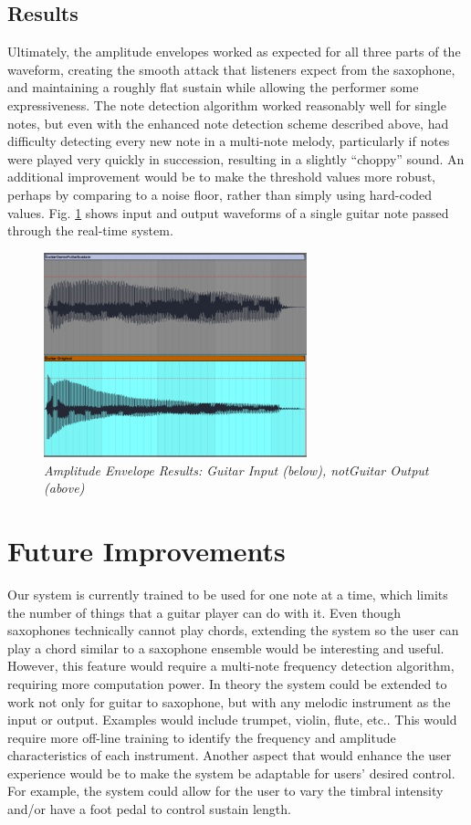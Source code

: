 \documentclass[twoside,a4paper]{article}
\begin{document}
\subsection {Results}
Ultimately, the amplitude envelopes worked as expected for all three parts
of the waveform,  creating the smooth attack that listeners expect from the
saxophone, and maintaining a roughly flat sustain while allowing the performer
some expressiveness. The note detection algorithm
worked reasonably well for single notes, but even with the enhanced note detection
scheme described above, had difficulty detecting every new note in a multi-note melody,
particularly if notes were played very quickly in succession, resulting in a slightly
``choppy'' sound. An additional improvement would be to make the threshold values more robust,
perhaps by comparing to a noise floor, rather than simply using hard-coded values.
Fig. \ref{Result} shows input and output waveforms of a single guitar note passed through
the real-time system.

\begin{figure}[ht]
  \includegraphics[width=3in]{Pictures/Final_pic.PNG}
  \centering
  \caption{\label{Result} {\it Amplitude Envelope Results: Guitar Input (below), notGuitar Output (above)}}
  \centering
  \end{figure}

\section{Future Improvements}
Our system is currently trained to be used for one note at a time,
which limits the number of things that a guitar player can do with
it. Even though saxophones technically cannot play chords, extending
the system so the user can play a chord similar to a 
saxophone ensemble would be interesting and useful.
However, this feature would require a multi-note frequency detection
algorithm, requiring more computation power.
\newline\newline
In theory the system could be extended to work not only for guitar
to saxophone, but with any melodic instrument as the input or output.
Examples would include trumpet, violin, flute, etc.. This would
require more off-line training to identify the frequency and
amplitude characteristics of each instrument. Another aspect that would enhance the user experience
would be to make the system be adaptable for users' desired control.
For example, the system could allow for the user to vary the timbral intensity
and/or have a foot pedal to control sustain length.
\end{document}
